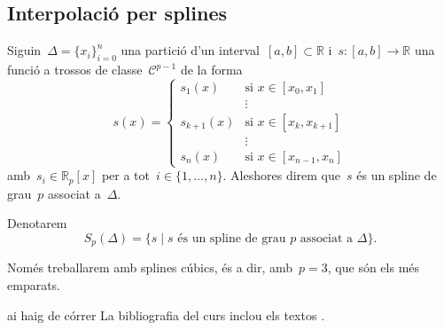 \documentclass[../../main.tex]{subfiles}
\begin{document}
    \subsection{Interpolació per splines}
    \begin{definition}
        Siguin~\(\Delta=\{x_{i}\}_{i=0}^{n}\) una partició d'un interval~\([a,b]\subset\mathbb{R}\) i~\(s\colon[a,b]\longrightarrow\mathbb{R}\) una funció a trossos de classe~\(\mathcal{C}^{p-1}\) de la forma
        \[s(x)=\begin{cases}
        s_{1}(x) & \text{si }x\in[x_{0},x_{1}]\\
        & \vdots\\
        s_{k+1}(x) & \text{si }x\in[x_{k},x_{k+1}]\\
        & \vdots\\
        s_{n}(x) & \text{si }x\in[x_{n-1},x_{n}]
        \end{cases}\]
        amb~\(s_{i}\in\mathbb{R}_{p}[x]\) per a tot~\(i\in\{1,\dots,n\}\).
        Aleshores direm que~\(s\) és un spline de grau~\(p\) associat a~\(\Delta\).

        Denotarem
        \[
            S_{p}(\Delta)=\{s\mid s\text{ és un spline de grau }p\text{ associat a }\Delta\}.
        \]
    \end{definition}
    \begin{note}
        Només treballarem amb splines cúbics, és a dir, amb~\(p=3\), que són els més emparats.
    \end{note}
    ai haig de córrer
    \printbibliography
    La bibliografia del curs inclou els textos \cite{MondeloApuntsMetodes, EinesBasiquesCalculNumeric, BurdenFairesNumericalAnalysis, GrauNogueraCalculnumeric, KincaidCheneyNumericalAnalysis, HenriciElementsOfNumericalAnalysis, DahlquistBjorck, IsaacsonKellerAnalysisOfNumericalMethods, StoerBulirschIntroductionToNumericalAnalysis, TheCProgrammingLanguage, ThePracticeOfProgramming}.
\end{document}
